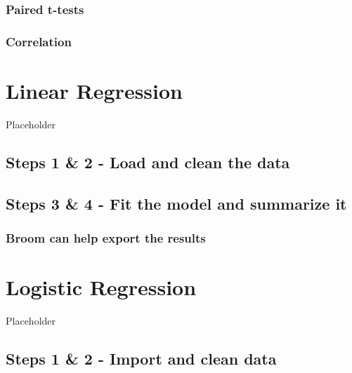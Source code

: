 \documentclass[
]{book}
\begin{document}
\hypertarget{paired-t-tests}{%
\subsection{Paired t-tests}\label{paired-t-tests}}

\hypertarget{correlation}{%
\subsection{Correlation}\label{correlation}}

\hypertarget{linear-regression}{%
\chapter{Linear Regression}\label{linear-regression}}

Placeholder

\hypertarget{steps-1-2---load-and-clean-the-data}{%
\section{Steps 1 \& 2 - Load and clean the data}\label{steps-1-2---load-and-clean-the-data}}

\hypertarget{steps-3-4---fit-the-model-and-summarize-it}{%
\section{Steps 3 \& 4 - Fit the model and summarize it}\label{steps-3-4---fit-the-model-and-summarize-it}}

\hypertarget{broom-can-help-export-the-results}{%
\subsection{Broom can help export the results}\label{broom-can-help-export-the-results}}

\hypertarget{logistic-regression}{%
\chapter{Logistic Regression}\label{logistic-regression}}

Placeholder

\hypertarget{steps-1-2---import-and-clean-data}{%
\section{Steps 1 \& 2 - Import and clean data}\label{steps-1-2---import-and-clean-data}}
\end{document}
